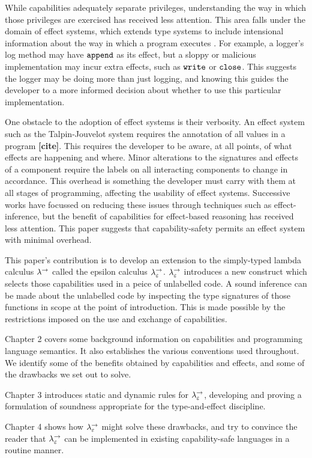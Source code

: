 While capabilities adequately separate privileges, understanding the way in which those privileges are exercised has received less attention. This area falls under the domain of effect systems, which extends type systems to include intensional information about the way in which a program executes \cite{nielson99}. For example, a logger's log method may have $\mathtt{append}$ as its effect, but a sloppy or malicious implementation may incur extra effects, such as $\mathtt{write}$ or $\mathtt{close}$. This suggests the logger may be doing more than just logging, and knowing this guides the developer to a more informed decision about whether to use this particular implementation.

One obstacle to the adoption of effect systems is their verbosity. An effect system such as the Talpin-Jouvelot system requires the annotation of all values in a program \textbf{[cite]}. This requires the developer to be aware, at all points, of what effects are happening and where. Minor alterations to the signatures and effects of a component require the labels on all interacting components to change in accordance. This overhead is something the developer must carry with them at all stages of programming, affecting the usability of effect systems. Successive works have focussed on reducing these issues through techniques such as effect-inference, but the benefit of capabilities for effect-based reasoning has received less attention. This paper suggests that capability-safety permits an effect system with minimal overhead.

This paper's contribution is to develop an extension to the simply-typed lambda calculus $\lambda^{\rightarrow}$ called the epsilon calculus $\lambda^{\rightarrow}_{\varepsilon}$. $\lambda^{\rightarrow}_{\varepsilon}$ introduces a new construct which selects those capabilities used in a peice of unlabelled code. A sound inference can be made about the unlabelled code by inspecting the type signatures of those functions in scope at the point of introduction. This is made possible by the restrictions imposed on the use and exchange of capabilities.

Chapter 2 covers some background information on capabilities and programming language semantics. It also establishes the various conventions used throughout. We identify some of the benefits obtained by capabilities and effects, and some of the drawbacks we set out to solve.

Chapter 3 introduces static and dynamic rules for $\lambda^{\rightarrow}_{\varepsilon}$, developing and proving a formulation of soundness appropriate for the type-and-effect discipline. 

Chapter 4 shows how $\lambda^{\rightarrow}_{\varepsilon}$ might solve these drawbacks, and try to convince the reader that $\lambda^{\rightarrow}_{\varepsilon}$ can be implemented in existing capability-safe languages in a routine manner.
 
